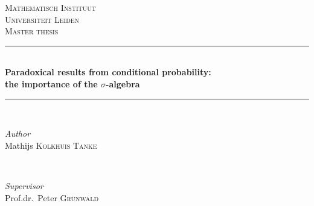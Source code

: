 	\newcommand{\HRule}{\rule{\linewidth}{0.5mm}} %
	
	\center %
	
	
	\textsc{\LARGE Mathematisch Instituut\\\vspace{0.5em}Universiteit Leiden}\\[1.0cm] %
	
	\textsc{\Large Master thesis}\\[0.5cm] %
		
	
	\HRule\\[0.4cm]
	
	{\huge\bfseries Paradoxical results from conditional probability:\\\vspace{0.25em}the importance of the $\sigma$-algebra}\\[0.4cm] %
	
	\HRule\\[1.5cm]
	

	\begin{minipage}{0.5\textwidth}
		\begin{flushleft}
			\large
			\textit{Author}\\
			Mathijs \textsc{Kolkhuis Tanke} %
		\end{flushleft}
	\end{minipage}
	~
	\begin{minipage}{0.4\textwidth}
		\begin{flushright}
			\large
			\textit{Supervisor}\\
			Prof.dr.~Peter \textsc{Grünwald} %
		\end{flushright}
	\end{minipage}
	
	
